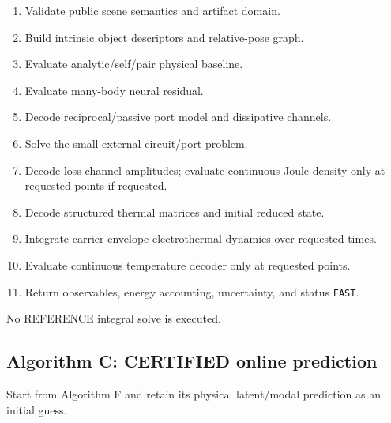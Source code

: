 \begin{enumerate}
\item Validate public scene semantics and artifact domain.
\item Build intrinsic object descriptors and relative-pose graph.
\item Evaluate analytic/self/pair physical baseline.
\item Evaluate many-body neural residual.
\item Decode reciprocal/passive port model and dissipative channels.
\item Solve the small external circuit/port problem.
\item Decode loss-channel amplitudes; evaluate continuous Joule density only at
      requested points if requested.
\item Decode structured thermal matrices and initial reduced state.
\item Integrate carrier-envelope electrothermal dynamics over requested times.
\item Evaluate continuous temperature decoder only at requested points.
\item Return observables, energy accounting, uncertainty, and status
      \texttt{FAST}.
\end{enumerate}

No REFERENCE integral solve is executed.

\subsection{Algorithm C: CERTIFIED online prediction}

Start from Algorithm F and retain its physical latent/modal prediction as an
initial guess.

